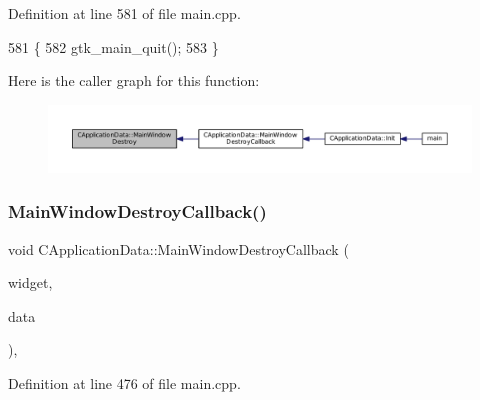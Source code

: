 Definition at line 581 of file main.\+cpp.


\begin{DoxyCode}
581                                                          \{
582     gtk\_main\_quit();
583 \}
\end{DoxyCode}
Here is the caller graph for this function\+:\nopagebreak
\begin{figure}[H]
\begin{center}
\leavevmode
\includegraphics[width=350pt]{classCApplicationData_a202437b2380956a5519722937cd9f96a_icgraph}
\end{center}
\end{figure}
\hypertarget{classCApplicationData_a379327c78dc57aa9dcef77e1b98efa2d}{}\label{classCApplicationData_a379327c78dc57aa9dcef77e1b98efa2d} 
\subsubsection{\texorpdfstring{Main\+Window\+Destroy\+Callback()}{MainWindowDestroyCallback()}}
{\footnotesize\ttfamily void C\+Application\+Data\+::\+Main\+Window\+Destroy\+Callback (\begin{DoxyParamCaption}\item[{Gtk\+Widget $\ast$}]{widget,  }\item[{gpointer}]{data }\end{DoxyParamCaption})\hspace{0.3cm}{\ttfamily [static]}, {\ttfamily [protected]}}



Definition at line 476 of file main.\+cpp.


